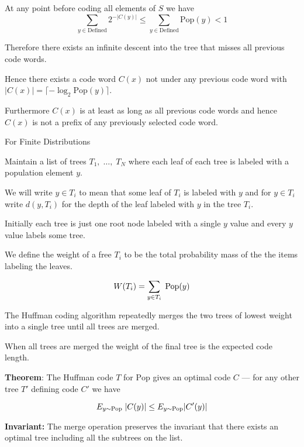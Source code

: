 
At any point before coding all elements of $S$ we have
$$\sum_{y \in \mathrm{Defined}} 2^{-|C(y)|} \leq \sum_{y \in \mathrm{Defined}} \mathrm{Pop}(y) < 1$$

\vfill
Therefore there exists an infinite descent into the tree that misses all previous code words.

\vfill
Hence there exists a code word $C(x)$ not under any previous code word with
$|C(x)| = \lceil - \log_2 \mathrm{Pop}(y)\rceil$.

\vfill
Furthermore $C(x)$ is at least as long as all previous code words and hence $C(x)$ is not a prefix of any previously selected code word.

{For Finite Distributions}

Maintain a list of trees $T_1,\;\dots,\;T_N$ where each leaf of each tree is labeled with a population element $y$.

\vfill
We will write $y \in T_i$ to mean that some leaf of $T_i$ is labeled with $y$ and for $y \in T_i$ write $d(y,T_i)$ for the depth
of the leaf labeled with $y$ in the tree $T_i$.

\vfill
Initially each tree is just one root node labeled with a single $y$ value and every $y$ value labels some tree.


\vfill
We define the weight of a free $T_i$ to be the total probability mass of the the items labeling the leaves.

$$W(T_i) = \sum_{y \in T_i}\;\mathrm{Pop}(y)$$

\vfill
The Huffman coding algorithm repeatedly merges the two trees of lowest weight into a single tree until all trees are merged.

\vfill
When all trees are merged the weight of the final tree is the expected code length.


{\bf Theorem}: The Huffman code $T$ for $\mathrm{Pop}$ gives an optimal code $C$ --- for any other tree $T'$ defining code $C'$ we have

$$E_{y \sim \mathrm{Pop}}\;|C(y)| \leq E_{y \sim \mathrm{Pop}} |C'(y)|$$

\vfill
{\bf Invariant:} The merge operation preserves the invariant that there exists an optimal tree including
all the subtrees on the list.


